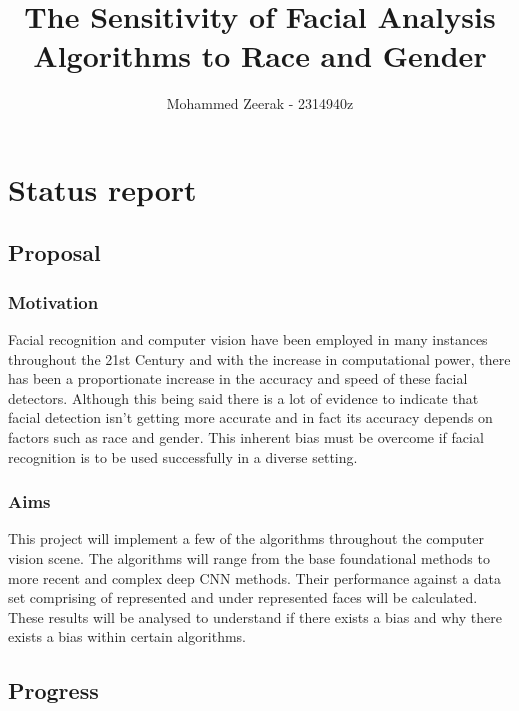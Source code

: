 \documentclass[11pt]{article}
\title{The Sensitivity of Facial Analysis Algorithms to Race and Gender}
\author{Mohammed Zeerak - 2314940z}
\begin{document}
\maketitle


     

\section{Status report}

\subsection{Proposal}\label{proposal}

\subsubsection{Motivation}\label{motivation}

Facial recognition and computer vision have been employed in many instances throughout the 21st Century and with the increase in computational power, there has been a proportionate increase in the accuracy and speed of these facial detectors. Although this being said there is a lot of evidence to indicate that facial detection isn't getting more accurate and in fact its accuracy depends on factors such as race and gender. This inherent bias must be overcome if facial recognition is to be used successfully in a diverse setting.

\subsubsection{Aims}\label{aims}

This project will implement a few of the algorithms throughout the computer vision scene. The algorithms will range from the base foundational methods to more recent and complex deep CNN methods. Their performance against a data set comprising of represented and under represented faces will be calculated. These results will be analysed to understand if there exists a bias and why there exists a bias within certain algorithms. 

\subsection{Progress}\label{progress}
\end{document}
